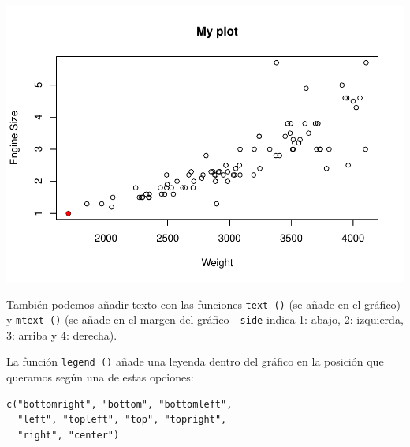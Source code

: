 \documentclass[
]{book}
\newenvironment{Shaded}{\begin{snugshade}}{\end{snugshade}}
\newcommand{\AttributeTok}[1]{\textcolor[rgb]{0.77,0.63,0.00}{#1}}
\newcommand{\DecValTok}[1]{\textcolor[rgb]{0.00,0.00,0.81}{#1}}
\newcommand{\FloatTok}[1]{\textcolor[rgb]{0.00,0.00,0.81}{#1}}
\newcommand{\FunctionTok}[1]{\textcolor[rgb]{0.00,0.00,0.00}{#1}}
\newcommand{\NormalTok}[1]{#1}
\newcommand{\SpecialCharTok}[1]{\textcolor[rgb]{0.00,0.00,0.00}{#1}}
\newcommand{\StringTok}[1]{\textcolor[rgb]{0.31,0.60,0.02}{#1}}
\begin{document}
\includegraphics{fig/unnamed-chunk-93-1.pdf}

También podemos añadir texto con las funciones \texttt{text\ ()} (se añade en el gráfico) y \texttt{mtext\ ()} (se añade en el margen del gráfico - \texttt{side} indica 1: abajo, 2: izquierda, 3: arriba y 4: derecha).

La función \texttt{legend\ ()} añade una leyenda dentro del gráfico en la posición que queramos según una de estas opciones:

\begin{verbatim}
c("bottomright", "bottom", "bottomleft",
  "left", "topleft", "top", "topright", 
  "right", "center")
\end{verbatim}

\begin{Shaded}
\end{Shaded}
\end{document}
